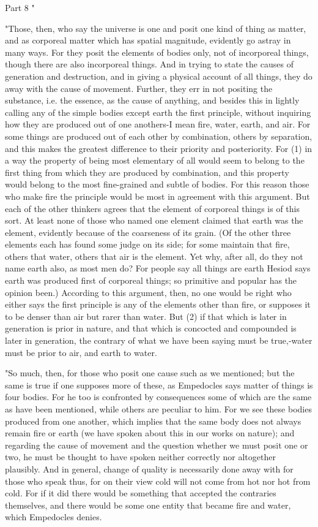 Part 8 "

"Those, then, who say the universe is one and posit one kind of thing
as matter, and as corporeal matter which has spatial magnitude, evidently
go astray in many ways. For they posit the elements of bodies only,
not of incorporeal things, though there are also incorporeal things.
And in trying to state the causes of generation and destruction, and
in giving a physical account of all things, they do away with the
cause of movement. Further, they err in not positing the substance,
i.e. the essence, as the cause of anything, and besides this in lightly
calling any of the simple bodies except earth the first principle,
without inquiring how they are produced out of one anothers-I mean
fire, water, earth, and air. For some things are produced out of each
other by combination, others by separation, and this makes the greatest
difference to their priority and posteriority. For (1) in a way the
property of being most elementary of all would seem to belong to the
first thing from which they are produced by combination, and this
property would belong to the most fine-grained and subtle of bodies.
For this reason those who make fire the principle would be most in
agreement with this argument. But each of the other thinkers agrees
that the element of corporeal things is of this sort. At least none
of those who named one element claimed that earth was the element,
evidently because of the coarseness of its grain. (Of the other three
elements each has found some judge on its side; for some maintain
that fire, others that water, others that air is the element. Yet
why, after all, do they not name earth also, as most men do? For people
say all things are earth Hesiod says earth was produced first of corporeal
things; so primitive and popular has the opinion been.) According
to this argument, then, no one would be right who either says the
first principle is any of the elements other than fire, or supposes
it to be denser than air but rarer than water. But (2) if that which
is later in generation is prior in nature, and that which is concocted
and compounded is later in generation, the contrary of what we have
been saying must be true,-water must be prior to air, and earth to
water. 

"So much, then, for those who posit one cause such as we mentioned;
but the same is true if one supposes more of these, as Empedocles
says matter of things is four bodies. For he too is confronted by
consequences some of which are the same as have been mentioned, while
others are peculiar to him. For we see these bodies produced from
one another, which implies that the same body does not always remain
fire or earth (we have spoken about this in our works on nature);
and regarding the cause of movement and the question whether we must
posit one or two, he must be thought to have spoken neither correctly
nor altogether plausibly. And in general, change of quality is necessarily
done away with for those who speak thus, for on their view cold will
not come from hot nor hot from cold. For if it did there would be
something that accepted the contraries themselves, and there would
be some one entity that became fire and water, which Empedocles denies.

